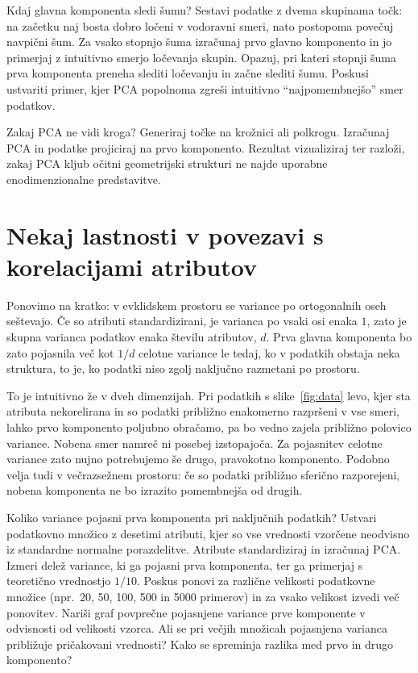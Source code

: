 \begin{exercise}{Kdaj glavna komponenta sledi šumu?}
Sestavi podatke z dvema skupinama točk: na začetku naj bosta dobro ločeni v vodoravni smeri, nato postopoma povečuj navpični šum. Za vsako stopnjo šuma izračunaj prvo glavno komponento in jo primerjaj z intuitivno smerjo ločevanja skupin. Opazuj, pri kateri stopnji šuma prva komponenta preneha slediti ločevanju in začne slediti šumu. Poskusi ustvariti primer, kjer PCA popolnoma zgreši intuitivno ``najpomembnejšo'' smer podatkov.
\end{exercise}
    
\begin{exercise}{Zakaj PCA ne vidi kroga?}
Generiraj točke na krožnici ali polkrogu. Izračunaj PCA in podatke projiciraj na prvo komponento. Rezultat vizualiziraj ter razloži, zakaj PCA kljub očitni geometrijski strukturi ne najde uporabne enodimenzionalne predstavitve.
\end{exercise}

\section{Nekaj lastnosti v povezavi s korelacijami atributov}

Ponovimo na kratko: v evklidskem prostoru se variance po ortogonalnih oseh seštevajo. Če so atributi standardizirani, je varianca po vsaki osi enaka \(1\), zato je skupna varianca podatkov enaka številu atributov, \(d\). Prva glavna komponenta bo zato pojasnila več kot \(1/d\) celotne variance le tedaj, ko v podatkih obstaja neka struktura, to je, ko podatki niso zgolj naključno razmetani po prostoru.

To je intuitivno že v dveh dimenzijah. Pri podatkih s slike~\ref{fig:data} levo, kjer sta atributa nekorelirana in so podatki približno enakomerno razpršeni v vse smeri, lahko prvo komponento poljubno obračamo, pa bo vedno zajela približno polovico variance. Nobena smer namreč ni posebej izstopajoča. Za pojasnitev celotne variance zato nujno potrebujemo še drugo, pravokotno komponento. Podobno velja tudi v večrazsežnem prostoru: če so podatki približno sferično razporejeni, nobena komponenta ne bo izrazito pomembnejša od drugih.

\begin{exercise}{Koliko variance pojasni prva komponenta pri naključnih podatkih?}
Ustvari podatkovno množico z desetimi atributi, kjer so vse vrednosti vzorčene neodvisno iz standardne normalne porazdelitve. Atribute standardiziraj in izračunaj PCA. Izmeri delež variance, ki ga pojasni prva komponenta, ter ga primerjaj s teoretično vrednostjo $1/10$. Poskus ponovi za različne velikosti podatkovne množice (npr.\ 20, 50, 100, 500 in 5000 primerov) in za vsako velikost izvedi več ponovitev. Nariši graf povprečne pojasnjene variance prve komponente v odvisnosti od velikosti vzorca. Ali se pri večjih množicah pojasnjena varianca približuje pričakovani vrednosti? Kako se spreminja razlika med prvo in drugo komponento?
\end{exercise}

